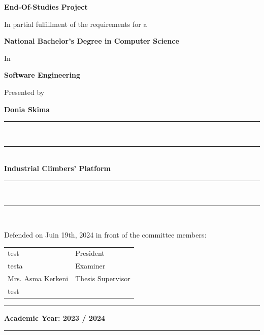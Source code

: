 \begin{titlepage}
\begin{center}
        \vspace{2cm}

        \Huge\textbf{End-Of-Studies Project}

        \vspace{1.5cm}

        \normalsize In partial fulfillment of the requirements for a

        \Large\textbf{National Bachelor's Degree in Computer Science        }

        \normalsize In

        \Large\textbf{Software Engineering}

        \normalsize Presented by

        \large{\textbf{Donia Skima}}
        \vspace{0.5cm}

        \rule[5pt]{0.5\textwidth}{0.5px}\\
        \vspace{-16px}
        \rule[10pt]{0.5\textwidth}{2.5px} \\
        \LARGE{\textbf{Industrial Climbers' Platform        }} \\
        \rule[5pt]{0.5\textwidth}{0.5px}\\
        \vspace{-15px}
        \rule[10pt]{0.5\textwidth}{2.5px} \\


        \vspace{1cm}

        \small Defended on Juin 19th, 2024 in front of the committee members:

        \renewcommand\arraystretch{1}
        \begin{tabular}{m{} l }
            test  & President               \\
            testa  & Examiner                \\
            Mrs. Asma Kerkeni  & Thesis Supervisor       \\
            test
        \end{tabular}
    \end{center}
    \vfill
    \centering
    \rule[0.5px]{30px}{0.5px} \space \footnotesize \textbf{Academic Year: 2023 / 2024} \space \rule[0.5px]{30px}{0.5px}
\end{titlepage}
\cleardoublepage